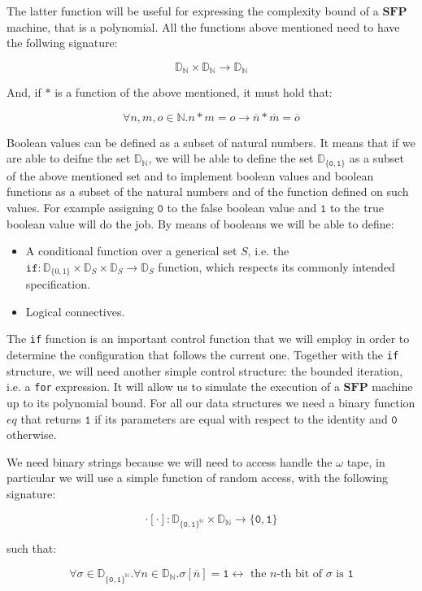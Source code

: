\documentclass[10pt]{amsart}
\newcommand{\SFP}{\mathbf{SFP}}
\newcommand{\zero}{\mathtt{0}}
\newcommand{\one}{\mathtt{1}}
\newcommand{\none}{n}
\newcommand{\ntwo}{m}
\newcommand{\NN}{\mathbb{N}}
\newcommand{\DD}{\mathbb{D}}
\newcommand{\oone}{\omega}
\newcommand{\If}{\mathtt{if}}
\begin{document}
The latter function will be useful for expressing the complexity bound of a $\SFP$ machine, that is a polynomial. All the functions above mentioned need to have the follwing signature:

$$
\DD_\NN \times \DD_\NN \longrightarrow \DD_\NN
$$

And, if $*$ is a function of the above mentioned, it must hold that:

$$
\forall \none, \ntwo, o \in \NN. \none *\ntwo = o \to \overline \none *\overline \ntwo = \overline o
$$


Boolean values can be defined as a subset of natural numbers. It means that if we are able to deifne the set $\DD_\NN$, we will be able to define the set $\DD_{\{\zero, \one\}}$ as a subset of the above mentioned set and to implement boolean values and boolean functions as a subset of the natural numbers and of the function defined on such values. For example assigning $\zero$ to the false boolean value and $\one$ to the true boolean value will do the job. By means of booleans we will be able to define:

\begin{itemize}
\item A conditional function over a generical set $S$, i.e. the $\If: \DD_{\{0, 1\}}\times \DD_S \times \DD_S \longrightarrow \DD_S$ function, which respects its commonly intended specification.
\item Logical connectives.
\end{itemize}

The \texttt{if} function is an important control function that we will employ in order to determine the configuration that follows the current one. Together with the \texttt{if} structure, we will need another simple control structure: the bounded iteration, i.e. a \texttt{for} expression. It will allow us to simulate the execution of a $\SFP$ machine up to its polynomial bound. For all our data structures we need a binary function $eq$ that returns $\one$ if its parameters are equal with respect to the identity and $\zero$ otherwise.

We need binary strings because we will need to access handle the $\oone$ tape, in particular we will use a simple function of random access, with the following signature:

$$
\cdot[\cdot]: \DD_{\{\zero, \one\}^\NN} \times \DD_\NN \longrightarrow \{\zero, \one\}
$$

such that:

$$
\forall \sigma \in \DD_{\{\zero, \one\}^\NN}.\forall n \in \DD_\NN. \sigma[\overline n] = \one \leftrightarrow \text{ the $n$-th bit of $\sigma$ is $\one$}
$$
\end{document}
